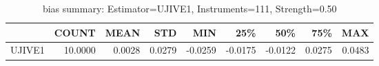 \begin{table}[ht]
\centering
\caption{bias summary: Estimator=UJIVE1, Instruments=111, Strength=0.50}
\begin{tabular}{lrrrrrrrr}
\toprule
 & COUNT & MEAN & STD & MIN & 25\% & 50\% & 75\% & MAX \\
\midrule
UJIVE1 & 10.0000 & 0.0028 & 0.0279 & -0.0259 & -0.0175 & -0.0122 & 0.0275 & 0.0483 \\
\bottomrule
\end{tabular}
\end{table}
